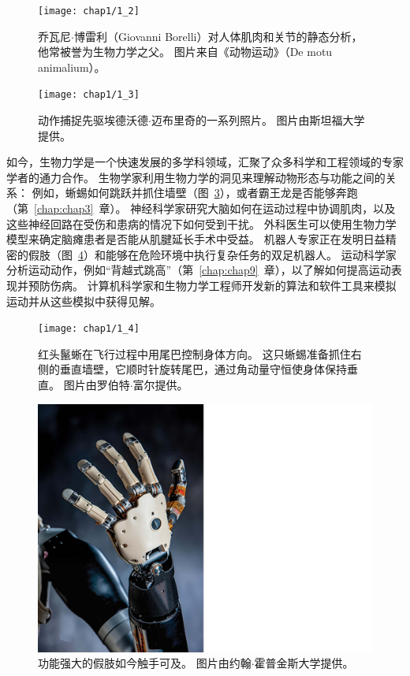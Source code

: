 \begin{figure}[!htb]
	\centering
	\texttt{[image: chap1/1\_2]}
	\caption{乔瓦尼$\cdot$博雷利（Giovanni Borelli）对人体肌肉和关节的静态分析，他常被誉为生物力学之父。
		图片来自《动物运动》（De motu animalium）。 \label{fig:1_2}}
\end{figure}


\begin{figure}[!htb]
	\centering
	\texttt{[image: chap1/1\_3]}
	\caption{动作捕捉先驱埃德沃德$\cdot$迈布里奇的一系列照片。
		图片由斯坦福大学提供。  \label{fig:1_3}}
\end{figure}


如今，生物力学是一个快速发展的多学科领域，汇聚了众多科学和工程领域的专家学者的通力合作。
生物学家利用生物力学的洞见来理解动物形态与功能之间的关系：
例如，蜥蜴如何跳跃并抓住墙壁（图~\ref{fig:1_4}），或者霸王龙是否能够奔跑（第~\ref{chap:chap3}~章）。
神经科学家研究大脑如何在运动过程中协调肌肉，以及这些神经回路在受伤和患病的情况下如何受到干扰。
外科医生可以使用生物力学模型来确定脑瘫患者是否能从肌腱延长手术中受益。
机器人专家正在发明日益精密的假肢（图~\ref{fig:1_5}）和能够在危险环境中执行复杂任务的双足机器人。
运动科学家分析运动动作，例如“背越式跳高”（第~\ref{chap:chap9}~章），以了解如何提高运动表现并预防伤病。
计算机科学家和生物力学工程师开发新的算法和软件工具来模拟运动并从这些模拟中获得见解。


\begin{figure}[!htb]
	\centering
	\texttt{[image: chap1/1\_4]}
	\caption{红头鬣蜥在飞行过程中用尾巴控制身体方向。
		这只蜥蜴准备抓住右侧的垂直墙壁，它顺时针旋转尾巴，通过角动量守恒使身体保持垂直。
		图片由罗伯特$\cdot$富尔提供。 \label{fig:1_4}}
\end{figure}


\begin{figure}[!htb]
	\centering
	\includegraphics[width=0.5\linewidth]{chap1/1_5}
	\caption{功能强大的假肢如今触手可及。
		图片由约翰$\cdot$霍普金斯大学提供。 \label{fig:1_5}}
\end{figure}


